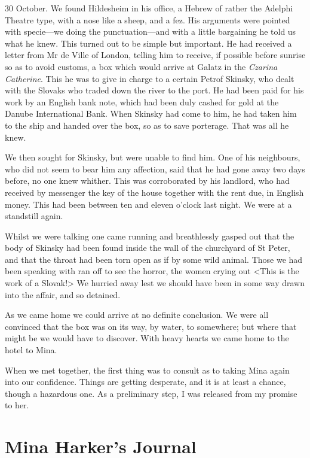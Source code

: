 \begin{diary}{30 October.}
We found Hildesheim in his office, a Hebrew of rather the Adelphi Theatre type, with a nose like a sheep, and a fez. His arguments were pointed with specie—we doing the punctuation—and with a little bargaining he told us what he knew. This turned out to be simple but important. He had received a letter from Mr de Ville of London, telling him to receive, if possible before sunrise so as to avoid customs, a box which would arrive at Galatz in the \textit{Czarina Catherine}. This he was to give in charge to a certain Petrof Skinsky, who dealt with the Slovaks who traded down the river to the port. He had been paid for his work by an English bank note, which had been duly cashed for gold at the Danube International Bank. When Skinsky had come to him, he had taken him to the ship and handed over the box, so as to save porterage. That was all he knew.

We then sought for Skinsky, but were unable to find him. One of his neighbours, who did not seem to bear him any affection, said that he had gone away two days before, no one knew whither. This was corroborated by his landlord, who had received by messenger the key of the house together with the rent due, in English money. This had been between ten and eleven o'clock last night. We were at a standstill again.

Whilst we were talking one came running and breathlessly gasped out that the body of Skinsky had been found inside the wall of the churchyard of St Peter, and that the throat had been torn open as if by some wild animal. Those we had been speaking with ran off to see the horror, the women crying out <This is the work of a Slovak!> We hurried away lest we should have been in some way drawn into the affair, and so detained.

As we came home we could arrive at no definite conclusion. We were all convinced that the box was on its way, by water, to somewhere; but where that might be we would have to discover. With heavy hearts we came home to the hotel to Mina.

When we met together, the first thing was to consult as to taking Mina again into our confidence. Things are getting desperate, and it is at least a chance, though a hazardous one. As a preliminary step, I was released from my promise to her.
\end{diary}


\section{Mina Harker's Journal}

